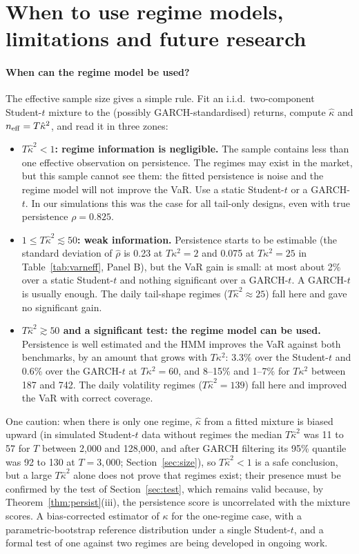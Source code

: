 \documentclass[12pt,letterpaper]{article}
\theoremstyle{plain}
\theoremstyle{remark}
\begin{document}
\section{When to use regime models, limitations and future research}\label{sec:disc}

\paragraph{When can the regime model be used?} The effective sample size gives a simple rule. Fit an i.i.d.\ two-component Student-$t$ mixture to the (possibly GARCH-standardised) returns, compute $\hat\kappa$ and $n_{\rm eff}=T\hat\kappa^2$, and read it in three zones:
\begin{itemize}
\item \textbf{$T\hat\kappa^2<1$: regime information is negligible.} The sample contains less than one effective observation on persistence. The regimes may exist in the market, but this sample cannot see them: the fitted persistence is noise and the regime model will not improve the VaR. Use a static Student-$t$ or a GARCH-$t$. In our simulations this was the case for all tail-only designs, even with true persistence $\rho=0.825$.
\item \textbf{$1\le T\hat\kappa^2\lesssim50$: weak information.} Persistence starts to be estimable (the standard deviation of $\hat\rho$ is 0.23 at $T\kappa^2=2$ and 0.075 at $T\kappa^2=25$ in Table~\ref{tab:varneff}, Panel B), but the VaR gain is small: at most about 2\% over a static Student-$t$ and nothing significant over a GARCH-$t$. A GARCH-$t$ is usually enough. The daily tail-shape regimes ($T\hat\kappa^2\approx25$) fall here and gave no significant gain.
\item \textbf{$T\hat\kappa^2\gtrsim50$ and a significant test: the regime model can be used.} Persistence is well estimated and the HMM improves the VaR against both benchmarks, by an amount that grows with $T\kappa^2$: 3.3\% over the Student-$t$ and 0.6\% over the GARCH-$t$ at $T\kappa^2=60$, and 8--15\% and 1--7\% for $T\kappa^2$ between 187 and 742. The daily volatility regimes ($T\hat\kappa^2=139$) fall here and improved the VaR with correct coverage.
\end{itemize}
One caution: when there is only one regime, $\hat\kappa$ from a fitted mixture is biased upward (in simulated Student-$t$ data without regimes the median $T\hat\kappa^2$ was 11 to 57 for $T$ between 2{,}000 and 128{,}000, and after GARCH filtering its 95\% quantile was 92 to 130 at $T=3{,}000$; Section~\ref{sec:size}), so $T\hat\kappa^2<1$ is a safe conclusion, but a large $T\hat\kappa^2$ alone does not prove that regimes exist; their presence must be confirmed by the test of Section~\ref{sec:test}, which remains valid because, by Theorem~\ref{thm:persist}(iii), the persistence score is uncorrelated with the mixture scores. A bias-corrected estimator of $\kappa$ for the one-regime case, with a parametric-bootstrap reference distribution under a single Student-$t$, and a formal test of one against two regimes are being developed in ongoing work.
\end{document}

